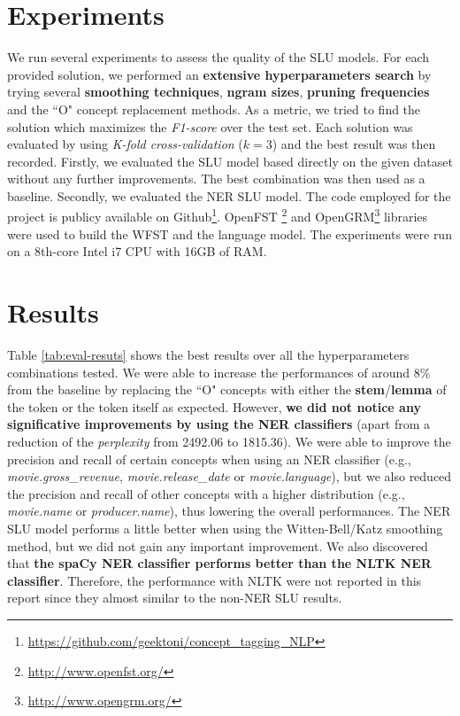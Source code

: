 \documentclass[11pt,a4paper]{article}
\begin{document}
\section{Experiments}

We run several experiments to assess the quality of 
the SLU models. For each provided solution, we performed an \textbf{extensive hyperparameters search} by trying several \textbf{smoothing techniques}, \textbf{ngram sizes}, \textbf{pruning frequencies} and the ``O" concept replacement methods. As a metric, we tried to find the solution which maximizes the \textit{F1-score} over the test set. Each solution was evaluated by using \textit{K-fold cross-validation} ($k=3$) and the best result was then recorded. Firstly, we evaluated the SLU model based directly on the given dataset without any further improvements. The best combination was then used as a baseline. Secondly, we evaluated the NER SLU model. 
The code employed for the project is publicy available on Github\footnote{\url{https://github.com/geektoni/concept\_tagging\_NLP}}. OpenFST \footnote{\url{http://www.openfst.org/}} and OpenGRM\footnote{\url{http://www.opengrm.org/}} libraries were used to build the WFST and the language model.
The experiments were run on a 8th-core Intel i7 CPU with 16GB of RAM. 



\section{Results}

Table \ref{tab:eval-resuts} shows the best results over all the hyperparameters combinations tested. We were able to increase the performances of around 8\% from the baseline by replacing the ``O" concepts with either the \textbf{stem}/\textbf{lemma} of the token or the token itself as expected.
However, \textbf{we did not notice any significative improvements by using the NER classifiers} (apart from a reduction of the \textit{perplexity} from 2492.06 to 1815.36).  We were able to improve the precision and recall of certain concepts when using an NER classifier (e.g., \textit{movie.gross\_revenue}, \textit{movie.release\_date} or \textit{movie.language}), but we also reduced the precision and recall of other concepts with a higher distribution (e.g., \textit{movie.name} or \textit{producer.name}), thus lowering the overall performances. The NER SLU model performs a little better when using the Witten-Bell/Katz smoothing method, but we did not gain any important improvement. We also discovered that \textbf{the spaCy NER classifier performs better than the NLTK NER classifier}. 
Therefore, the performance with NLTK were not reported in this report since they almost similar to the non-NER SLU results.
\end{document}
